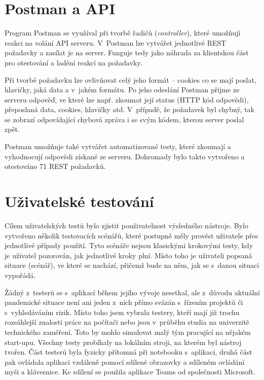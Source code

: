 \section{Postman a API}

Program Postman se využíval při tvorbě řadičů (\textit{controller}), které umožňují reakci na volání API serveru. V~Postman lze vytvářet jednotlivé REST požadavky a zasílat je na server. Funguje tedy jako náhrada za klientskou část pro otestování a ladění reakcí na požadavky. 

Při tvorbě požadavku lze ovlivňovat celý jeho formát – cookies co se mají poslat, hlavičky, jaká data a v~jakém formátu. Po jeho odeslání Postman přijme ze serveru odpověď, ve které lze např. zkoumat její status (HTTP kód odpovědi), přeposlaná data, cookies, hlavičky atd. V~případě, že požadavek byl chybný, tak se zobrazí odpovídající chybová zpráva i se svým kódem, kterou server poslal zpět.

Postman umožňuje také vytvářet automatizované testy, které zkoumají a vyhodnocují odpovědi získané ze serveru. Dohromady bylo takto vytvořeno a otestováno 71 REST požadavků.


\section{Uživatelské testování}

Cílem uživatelských testů bylo zjistit použivatelnost výsledného nástroje. Bylo vytvořeno několik testovacích scénářů, které postupně měly provést uživatele přes jednotlivé případy použití. Tyto scénáře nejsou klasickými krokovými testy, kdy je uživatel pozorován, jak jednotlivé kroky plní.  Místo toho je uživateli popsaná situace (scénář), ve které se nachází, přičemž bude na něm, jak se s~danou situaci vypořádá.

Žádný z~testerů se s~aplikací během jejího vývoje nesetkal, ale z~důvodu aktuální pandemické situace není ani jeden z~nich přímo svázán s~řízením projektů či s~vyhledáváním rizik. Místo toho jsem vybrala testery, kteří mají již trochu rozsáhlejší znalosti práce na počítači nebo jsou v~průběhu studia na univerzitě technického zaměření. Toto by mohlo simulovat malý tým pracující na nějakém start-upu. Všechny testy probíhaly na lokálním stroji, na kterém byl nástroj tvořen. Část testerů byla fyzicky přítomná při notebooku s~aplikaci, druhá část pak ovládala aplikaci vzdáleně pomocí sdílené obrazovky a sdíleném ovládání myši a klávesnice. Ke sdílení se použila aplikace Teams od společnosti Microsoft.

